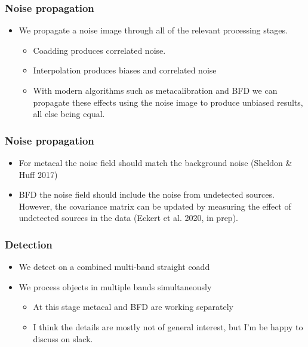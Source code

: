 \documentclass{beamer}
\begin{document}
\frame
{

    \frametitle{Noise propagation}

    \begin{itemize}

        \item We propagate a noise image through all of the relevant processing
            stages.

        \begin{itemize}
            \item Coadding produces correlated noise.
            \item Interpolation produces biases and correlated noise

            \item With modern algorithms such as metacalibration and BFD we can propagate
              these effects using the noise image to produce unbiased results, all
              else being equal.
        \end{itemize}


    \end{itemize}

}

\frame
{

    \frametitle{Noise propagation}

    \begin{itemize}

        \item For metacal the noise field should match the background noise (Sheldon \& Huff 2017)
            
        \item BFD the noise field should include the noise from undetected
            sources.  However, the covariance matrix can be updated by
            measuring the effect of undetected sources in the data (Eckert et
            al. 2020, in prep).

    \end{itemize}

}


\frame
{

    \frametitle{Detection}


    \begin{itemize}

        \item We detect on a combined multi-band straight coadd

        \item We process objects in multiple bands simultaneously 
            \begin{itemize}
                \item At this stage metacal and BFD are working separately
                \item I think the details are mostly not of general interest, but
                    I'm be happy to discuss on slack.
            \end{itemize}

    \end{itemize}

}
\end{document}

